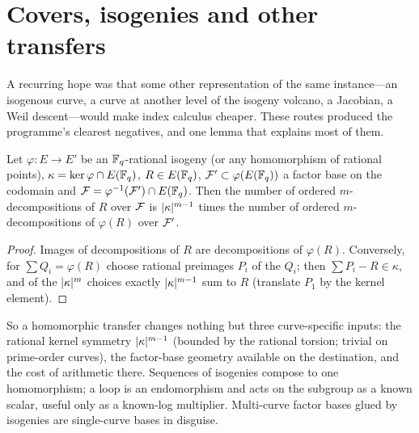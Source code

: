 \section{Covers, isogenies and other transfers}\label{sec:transfer}

A recurring hope was that some other representation of the same
instance---an isogenous curve, a curve at another level of the isogeny
volcano, a Jacobian, a Weil descent---would make index calculus cheaper.
These routes produced the programme's clearest negatives, and one lemma
that explains most of them.

\begin{lemma}\label{lem:conservation}
Let $\varphi:E\to E'$ be an $\mathbb{F}_q$-rational isogeny (or any homomorphism
of rational points), $\kappa=\ker\varphi\cap E(\mathbb{F}_q)$, $R\in E(\mathbb{F}_q)$,
$\mathcal{F}'\subset\varphi(E(\mathbb{F}_q))$ a factor base on the codomain and
$\mathcal{F}=\varphi^{-1}(\mathcal{F}')\cap E(\mathbb{F}_q)$. Then the number of ordered
$m$-decompositions of $R$ over $\mathcal{F}$ is $\lvert \kappa \rvert^{m-1}$ times the number
of ordered $m$-decompositions of $\varphi(R)$ over $\mathcal{F}'$.
\end{lemma}
\begin{proof}
Images of decompositions of $R$ are decompositions of $\varphi(R)$.
Conversely, for $\sum Q_i=\varphi(R)$ choose rational preimages $P_i$ of
the $Q_i$; then $\sum P_i-R\in\kappa$, and of the $\lvert \kappa \rvert^m$ choices
exactly $\lvert \kappa \rvert^{m-1}$ sum to $R$ (translate $P_1$ by the kernel
element).
\end{proof}

So a homomorphic transfer changes nothing but three curve-specific inputs:
the rational kernel symmetry $\lvert \kappa \rvert^{m-1}$ (bounded by the rational
torsion; trivial on prime-order curves), the factor-base geometry
available on the destination, and the cost of arithmetic there. Sequences
of isogenies compose to one homomorphism; a loop is an endomorphism and
acts on the subgroup as a known scalar, useful only as a known-log
multiplier. Multi-curve factor bases glued by isogenies are single-curve
bases in disguise.

